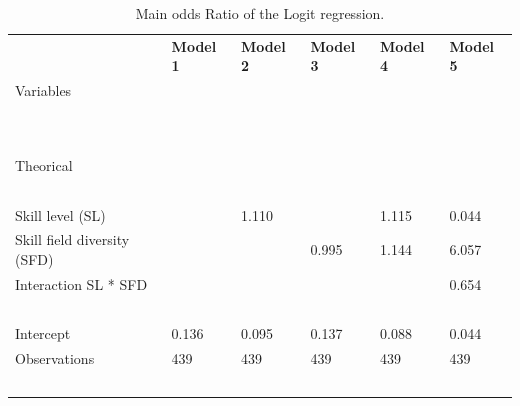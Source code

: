 \documentclass[12pt]{article}
\begin{document}
\clearpage
\begin{table}[!ht]
\scriptsize
    \centering
    \caption{Main odds Ratio of the Logit regression.}
    \begin{tabular}{llllll}
        \toprule
        ~ & \textbf{Model 1} & \textbf{Model 2} & \textbf{Model 3} & \textbf{Model 4} & \textbf{Model 5} \\
        Variables & ~ & ~ & ~ & ~ & ~ \\
        ~ & ~ & ~ & ~ & ~ & ~ \\
        \midrule
        ~ & ~ & ~ & ~ & ~ & ~ \\
        Theorical & ~ & ~ & ~ & ~ & ~ \\
        & ~ & ~ & ~ & ~ & ~ \\
        Skill level (SL) & ~ & 1.110 & ~ & 1.115 & 0.044 \\

        Skill field diversity (SFD) & ~ & ~ & 0.995 & 1.144 & 6.057 \\

        Interaction SL * SFD & ~ & ~ & ~ & ~ & 0.654 \\

        ~ & ~ & ~ & ~ & ~ & ~ \\

        Intercept & 0.136 & 0.095 & 0.137 & 0.088 & 0.044 \\

        Observations  & 439 & 439 & 439 & 439 & 439 \\
        ~ & ~ & ~ & ~ & ~ & ~ \\
        \midrule
    \end{tabular}

  \label{table8}
\end{table}
\end{document}
